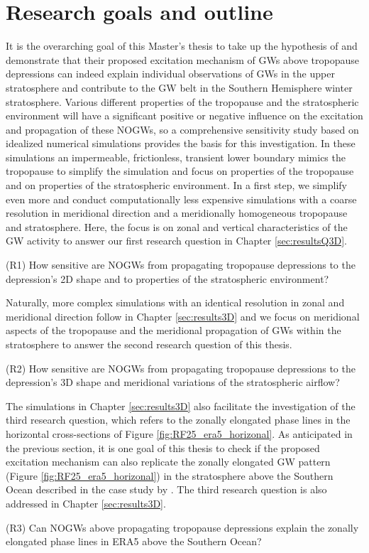 \section{Research goals and outline}
\label{sec:goals}
It is the overarching goal of this Master's thesis to take up the hypothesis of \textcite[]{dornbrack_stratospheric_2022} and demonstrate that their proposed excitation mechanism of GWs above tropopause depressions can indeed explain individual observations of GWs in the upper stratosphere and contribute to the GW belt in the Southern Hemisphere winter stratosphere. Various different properties of the tropopause and the stratospheric environment will have a significant positive or negative influence on the excitation and propagation of these NOGWs, so a comprehensive sensitivity study based on idealized numerical simulations provides the basis for this investigation. In these simulations an impermeable, frictionless, transient lower boundary mimics the tropopause to simplify the simulation and focus on properties of the tropopause and on properties of the stratospheric environment. In a first step, we simplify even more and conduct computationally less expensive simulations with a coarse resolution in meridional direction and a meridionally homogeneous tropopause and stratosphere. Here, the focus is on zonal and vertical characteristics of the GW activity to answer our first research question in Chapter \ref{sec:resultsQ3D}.
\begin{tcolorbox}[]
    (R1) How sensitive are NOGWs from propagating tropopause depressions to the depression's 2D shape and to properties of the stratospheric environment?
\end{tcolorbox}
Naturally, more complex simulations with an identical resolution in zonal and meridional direction follow in Chapter \ref{sec:results3D} and we focus on meridional aspects of the tropopause and the meridional propagation of GWs within the stratosphere to answer the second research question of this thesis.
\begin{tcolorbox}[]
    (R2) How sensitive are NOGWs from propagating tropopause depressions to the depression's 3D shape and meridional variations of the stratospheric airflow?
\end{tcolorbox}
The simulations in Chapter \ref{sec:results3D} also facilitate the investigation of the third research question, which refers to the zonally elongated phase lines in the horizontal cross-sections of Figure \ref{fig:RF25_era5_horizonal}. As anticipated in the previous section, it is one goal of this thesis to check if the proposed excitation mechanism can also replicate the zonally elongated GW pattern (Figure \ref{fig:RF25_era5_horizonal}) in the stratosphere above the Southern Ocean described in the case study by \textcite[]{dornbrack_stratospheric_2022}. The third research question is also addressed in Chapter \ref{sec:results3D}. %
\begin{tcolorbox}[]
    (R3) Can NOGWs above propagating tropopause depressions explain the zonally elongated phase lines in ERA5 above the Southern Ocean?
\end{tcolorbox}

